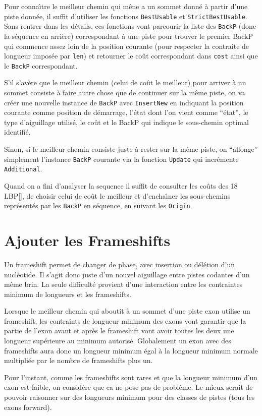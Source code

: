 \documentclass[a4paper]{article}
\begin{document}
Pour conna\^\i tre le meilleur chemin qui m\^ene a un sommet donn\'e \`a partir
d'une piste donn\'ee, il suffit d'utiliser les fonctions
\texttt{BestUsable} et \texttt{StrictBestUsable}. Sans rentrer dans
les d\'etails, ces fonctions vont parcourir la liste des \texttt{BackP}
(donc la s\'equence en arri\`ere) correspondant \`a une piste pour trouver
le premier BackP qui commence assez loin de la position courante (pour
respecter la contraite de longueur impos\'ee par \texttt{len}) et
retourner le co\^ut correspondant dans \texttt{cost} ainsi que le
\texttt{BackP} correspondant.

S'il s'av\`ere que le meilleur chemin (celui de co\^ut le meilleur) pour
arriver \`a un sommet consiste \`a faire autre chose que de continuer sur
la m\^eme piste, on va cr\'eer une nouvelle instance de \texttt{BackP}
avec \texttt{InsertNew} en indiquant la position courante comme
position de d\'emarrage, l'\'etat dont l'on vient comme ``\'etat'', le type
d'aiguillage utilis\'e, le co\^ut et le BackP qui indique le sous-chemin
optimal identifi\'e.

Sinon, si le meilleur chemin consiste juste \`a rester sur la m\^eme
piste, on ``allonge'' simplement l'instance \texttt{BackP} courante
via la fonction \texttt{Update} qui incr\'emente \texttt{Additional}.

Quand on a fini d'analyser la sequence il suffit de consulter les
co\^uts des 18 LBP[], de choisir celui de co\^ut le meilleur et
d'encha\^\i ner les sous-chemins repr\'esent\'es par les \texttt{BackP} en
s\'equence, en suivant les \texttt{Origin}.

\section{Ajouter les Frameshifts}

Un frameshift permet de changer de phase, avec insertion ou d\'el\'etion
d'un nucl\'eotide. Il s'agit donc juste d'un nouvel aiguillage entre
pistes codantes d'un m\^eme brin. La seule difficult\'e provient d'une
interaction entre les contraintes minimum de longueurs et les
frameshifts.

Lorsque le meilleur chemin qui aboutit \`a un sommet d'une piste exon
utilise un frameshift, les contraints de longueur minimum des exons
vont garantir que la partie de l'exon avant et apr\`es le frameshift
vont avoir toutes les deux une longueur sup\'erieure au minimum
autoris\'e. Globalement un exon avec des frameshifts aura donc un
longueur minimum \'egal \`a la longueur minimum normale multipli\'ee par le
nombre de frameshifts plus un.

Pour l'instant, comme les frameshifts sont rares et que la longueur
minimum d'un exon est faible, on consid\`ere que ca ne pose pas de
probl\`eme. Le mieux serait de pouvoir raisonner sur des longueurs
minimum pour des classes de pistes (tous les exons forward).
\end{document}
